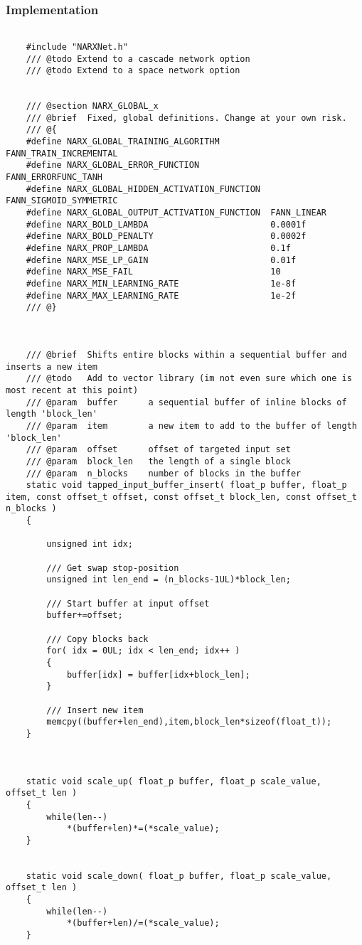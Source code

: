 \subsubsection{Implementation}
\begin{lstlisting}

	#include "NARXNet.h"
	/// @todo Extend to a cascade network option
	/// @todo Extend to a space network option


	/// @section NARX_GLOBAL_x
	/// @brief	Fixed, global definitions. Change at your own risk.
	/// @{
	#define NARX_GLOBAL_TRAINING_ALGORITHM			FANN_TRAIN_INCREMENTAL
	#define NARX_GLOBAL_ERROR_FUNCTION				FANN_ERRORFUNC_TANH
	#define NARX_GLOBAL_HIDDEN_ACTIVATION_FUNCTION	FANN_SIGMOID_SYMMETRIC
	#define NARX_GLOBAL_OUTPUT_ACTIVATION_FUNCTION	FANN_LINEAR
	#define NARX_BOLD_LAMBDA						0.0001f
	#define NARX_BOLD_PENALTY						0.0002f
	#define NARX_PROP_LAMBDA						0.1f
	#define NARX_MSE_LP_GAIN						0.01f
	#define	NARX_MSE_FAIL							10
	#define NARX_MIN_LEARNING_RATE					1e-8f
	#define NARX_MAX_LEARNING_RATE					1e-2f
	/// @}



	/// @brief	Shifts entire blocks within a sequential buffer and inserts a new item 
	///	@todo	Add to vector library (im not even sure which one is most recent at this point)
	///	@param	buffer		a sequential buffer of inline blocks of length 'block_len'
	/// @param	item		a new item to add to the buffer of length 'block_len'
	/// @param	offset		offset of targeted input set
	/// @param	block_len	the length of a single block
	///	@param	n_blocks	number of blocks in the buffer
	static void tapped_input_buffer_insert( float_p buffer, float_p item, const offset_t offset, const offset_t block_len, const offset_t n_blocks )
	{

		unsigned int idx;

		/// Get swap stop-position
		unsigned int len_end = (n_blocks-1UL)*block_len;
		
		/// Start buffer at input offset
		buffer+=offset;

		/// Copy blocks back
		for( idx = 0UL; idx < len_end; idx++ )
		{
			buffer[idx] = buffer[idx+block_len];	
		}

		/// Insert new item
		memcpy((buffer+len_end),item,block_len*sizeof(float_t));
	}



	static void scale_up( float_p buffer, float_p scale_value, offset_t len )
	{
		while(len--)
			*(buffer+len)*=(*scale_value);
	}


	static void scale_down( float_p buffer, float_p scale_value, offset_t len )
	{
		while(len--)
			*(buffer+len)/=(*scale_value);
	}



\end{lstlisting}
